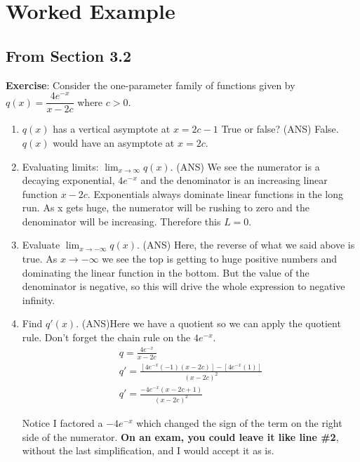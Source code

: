 \documentclass[10pt]{article}
\begin{document}
	\thispagestyle{empty}
\section{Worked Example}
\subsection{From Section 3.2}

\textbf{Exercise}: Consider the one-parameter family of functions given by $q(x) = \dfrac{4e^{-x}}{x-2c}$ where $c>0$.\\

\begin{enumerate}
	\item $q(x)$ has a vertical asymptote at $x=2c-1$ True or false?
		\subitem (ANS) False.  $ q(x) $ would have an asymptote at $x=2c$.
		
	\item Evaluating limits:  $\displaystyle\lim_{x\to \infty} q(x)$.  
		\subitem (ANS) We see the numerator is a decaying exponential, $4e^{-x}$ and the denominator is an increasing linear function $ x-2c $.  Exponentials always dominate linear functions in the long run.  As x gets huge, the numerator will be rushing to zero and the denominator will be increasing.  Therefore this $L = 0$.
	
	\item Evaluate $\displaystyle\lim_{x\to -\infty} q(x)$. 
		\subitem(ANS) Here, the reverse of what we said above is true.  As $x\to -\infty$ we see the top is getting to huge positive numbers and dominating the linear function in the bottom.  But the value of the denominator is negative, so this will drive the whole expression to negative infinity.
		
	\item Find $q'(x)$.  
		\subitem (ANS)Here we have a quotient so we can apply the quotient rule.  Don't forget the chain rule on the $4e^{-x}$.
		$$\begin{gathered}
			q = \frac{4e^{-x}}{x-2c}\\
			q' = \frac{[4e^{-x}(-1)(x-2c)] - [4e^{-x}(1)]}{(x-2c)^2}\\
			q ' = \frac{-4e^{-x}(x-2c+1)}{(x-2c)^2}
		\end{gathered}$$
	
	Notice I factored a $-4e^{-x}$ which changed the sign of the term on the right side of the numerator.  \textbf{On an exam, you could leave it like line \#2}, without the last simplification, and I would accept it as is.
	

\end{enumerate}
\end{document}
